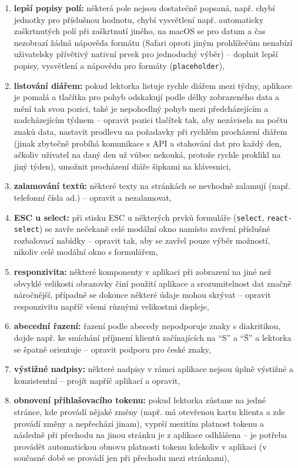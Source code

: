 \begin{enumerate}[label=\textbf{P\arabic*}]
    \item \label{P12} \textbf{lepší popisy polí:} některá pole nejsou dostatečně popsaná, např. chybí jednotky pro příslušnou hodnotu, chybí vysvětlení např. automaticky zaškrtnutých polí při zaškrtnutí jiného, na macOS se pro datum a čas nezobrazí žádná nápověda formátu (Safari oproti jiným prohlížečům nenabízí uživatelsky přívětivý nativní prvek pro jednoduchý výběr) -- doplnit lepší popisy, vysvětlení a nápovědu pro formáty (\verb|placeholder|),
    \item \label{P13} \textbf{listování diářem:} pokud lektorka listuje rychle diářem mezi týdny, aplikace je pomalá a tlačítka pro pohyb odskakují podle délky zobrazeného data a mění tak svou pozici, také je nepohodlný pohyb mezi předcházejícím a nadcházejícím týdnem -- opravit pozici tlačítek tak, aby nezávisela na počtu znaků data, nastavit prodlevu na požadavky při rychlém procházení diářem (jinak zbytečně probíhá komunikace s API a stahování dat pro každý den, ačkoliv uživatel na daný den už vůbec nekouká, protože rychle proklikl na jiný týden), umožnit procházení diáře šipkami na klávesnici,
    \item \label{P14} \textbf{zalamování textů:} některé texty na stránkách se nevhodně zalamují (např. telefonní čísla ad.) -- opravit a nezalamovat,
    \item \label{P15} \textbf{ESC u select:} při stisku ESC u některých prvků formuláře (\verb|select|, \verb|react-select|) se zavře nečekaně celé modální okno namísto zavření příslušné rozbalovací nabídky -- opravit tak, aby se zavřel pouze výběr možností, nikoliv celé modální okno s formulářem,
    \item \label{P16} \textbf{responzivita:} některé komponenty v aplikaci při zobrazení na jiné než obvyklé velikosti obrazovky činí použití aplikace a srozumitelnost dat značně náročnější, případně se dokonce některé údaje mohou skrývat -- opravit responzivitu napříč všemi různými velikostmi displeje,
    \item \label{P17} \textbf{abecední řazení:} řazení podle abecedy nepodporuje znaky s diakritikou, dojde např. ke smíchání příjmení klientů začínajících na \enquote{S} a \enquote{Š} a lektorka se špatně orientuje -- opravit podporu pro české znaky,
    \item \label{P18} \textbf{výstižné nadpisy:} některé nadpisy v rámci aplikace nejsou úplně výstižné a konzistentní -- projít napříč aplikací a opravit,
    \item \label{P19} \textbf{obnovení přihlašovacího tokenu:} pokud lektorka zůstane na jedné stránce, kde provádí nějaké změny (např. má otevřenou kartu klienta a zde provádí změny a nepřechází jinam), vyprší mezitím platnost tokenu a následně při přechodu na jinou stránku je z aplikace odhlášena -- je potřeba provádět automatickou obnovu platnosti tokenu kdekoliv v aplikaci (v současné době se provádí jen při přechodu mezi stránkami),

\end{enumerate}
